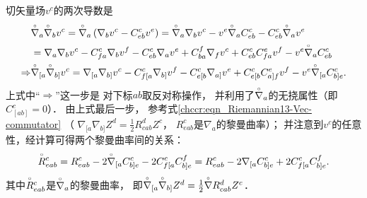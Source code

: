 切矢量场$v^c$的两次导数是
\setlength{\mathindent}{0em}
\begin{equation}\label{chrg:eqn_DDva}
    \begin{aligned}
        &\oversetmy{\circ}{\nabla}_{a} \oversetmy{\circ}{\nabla}_{b}v^c = 
        \oversetmy{\circ}{\nabla}_{a} \left(\nabla_{b} v^c - C^c_{eb} v^e \right) 
        =  \oversetmy{\circ}{\nabla}_{a} \nabla_{b} v^c 
        - v^e \oversetmy{\circ}{\nabla}_{a}  C^c_{eb} 
        -  C^c_{eb} \oversetmy{\circ}{\nabla}_{a} v^e \\
        &=   \nabla_{a} \nabla_{b} v^c - C^c_{fa}\nabla_{b} v^f  -  C^c_{eb}\nabla_{a} v^e
        + C^f_{ba} \nabla_{f}v^c     +  C^c_{eb} C^e_{fa} v^f 
        - v^e \oversetmy{\circ}{\nabla}_{a}  C^c_{eb}  \\
        \Rightarrow &
        \oversetmy{\circ}{\nabla}_{[a} \oversetmy{\circ}{\nabla}_{b]}v^c 
        =   \nabla_{[a} \nabla_{b]} v^c - C^c_{f[a}\nabla_{b]} v^f  -  C^c_{e[b}\nabla_{a]} v^e
        +  C^c_{e[b} C^e_{a]f} v^f - v^e \oversetmy{\circ}{\nabla}_{[a}  C^c_{b]e}    .
    \end{aligned}
\end{equation}\setlength{\mathindent}{2em}
上式中“$\Rightarrow$”这一步是
对下标$ab$取反对称操作，
并利用了$\oversetmy{\circ}{\nabla}_{a}$的无挠属性（即$C^c_{[ab]}=0$）．
由上式最后一步，
参考式\eqref{chccr:eqn_Riemannian13-Vec-commutator}
（ $\nabla_{[a} \nabla_{b]} Z^d = \frac{1}{2}R_{cab}^d Z^c $，
${R}_{eab}^c$是${\nabla}_{a}$的黎曼曲率）；
并注意到$v^c$的任意性，经计算可得两个黎曼曲率间的关系：
\begin{equation}\label{chrg:eqn_DDR}
    \oversetmy{\circ}{R}_{eab}^c  
    ={R}_{eab}^c - 2 \oversetmy{\circ}{\nabla}_{[a}  C^c_{b]e} - 2 C^c_{f[a} C^f_{b]e}
    ={R}_{eab}^c - 2 \nabla_{[a}  C^c_{b]e} + 2 C^c_{f[a} C^f_{b]e} .
\end{equation}
其中$\oversetmy{\circ}{R}_{eab}^c$是$\oversetmy{\circ}{\nabla}_{a}$的黎曼曲率，
即$\oversetmy{\circ}{\nabla}_{[a} \oversetmy{\circ}{\nabla}_{b]} Z^d 
= \frac{1}{2}\oversetmy{\circ}{\nabla}{R}_{cab}^d Z^c $．

%

